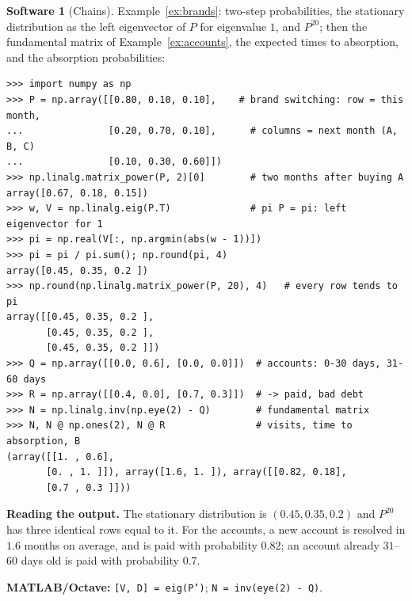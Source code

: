 \documentclass[11pt,a4paper]{article}
\numberwithin{equation}{section}
\theoremstyle{definition}
\newtheorem{software}[thm]{Software}
\begin{document}
\begin{software}[Chains]
\label{sw:chains}
Example~\ref{ex:brands}: two-step probabilities, the stationary distribution as the left eigenvector of $P$ for eigenvalue $1$, and $P^{20}$; then the fundamental matrix of Example~\ref{ex:accounts}, the expected times to absorption, and the absorption probabilities:
{\small\begin{verbatim}
>>> import numpy as np
>>> P = np.array([[0.80, 0.10, 0.10],    # brand switching: row = this month,
...               [0.20, 0.70, 0.10],      # columns = next month (A, B, C)
...               [0.10, 0.30, 0.60]])
>>> np.linalg.matrix_power(P, 2)[0]        # two months after buying A
array([0.67, 0.18, 0.15])
>>> w, V = np.linalg.eig(P.T)              # pi P = pi: left eigenvector for 1
>>> pi = np.real(V[:, np.argmin(abs(w - 1))])
>>> pi = pi / pi.sum(); np.round(pi, 4)
array([0.45, 0.35, 0.2 ])
>>> np.round(np.linalg.matrix_power(P, 20), 4)   # every row tends to pi
array([[0.45, 0.35, 0.2 ],
       [0.45, 0.35, 0.2 ],
       [0.45, 0.35, 0.2 ]])
>>> Q = np.array([[0.0, 0.6], [0.0, 0.0]])  # accounts: 0-30 days, 31-60 days
>>> R = np.array([[0.4, 0.0], [0.7, 0.3]])  # -> paid, bad debt
>>> N = np.linalg.inv(np.eye(2) - Q)        # fundamental matrix
>>> N, N @ np.ones(2), N @ R                # visits, time to absorption, B
(array([[1. , 0.6],
       [0. , 1. ]]), array([1.6, 1. ]), array([[0.82, 0.18],
       [0.7 , 0.3 ]]))
\end{verbatim}}
\textbf{Reading the output.} The stationary distribution is $(0.45, 0.35, 0.2)$ and $P^{20}$ has three identical rows equal to it. For the accounts, a new account is resolved in $1.6$ months on average, and is paid with probability $0.82$; an account already $31$--$60$ days old is paid with probability $0.7$.

\textbf{MATLAB/Octave:} \texttt{[V, D] = eig(P')}; \texttt{N = inv(eye(2) - Q)}.
\end{software}
\end{document}

